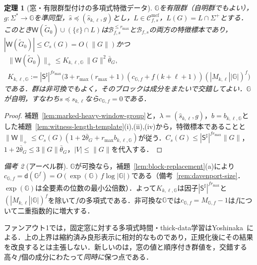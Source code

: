 \documentclass[11pt,a4paper]{ltjsarticle}
\numberwithin{equation}{section}
\theoremstyle{plain}
\newtheorem{theorem}{定理}[section]
\theoremstyle{definition}
\theoremstyle{remark}
\newtheorem{remark}[theorem]{備考}
\newcommand{\Wit}{\mathsf{W}}
\newcommand{\Cmcf}[2]{\mathcal{C}^{\mathrm{mcf}}_{#1,#2}}
\newcommand{\eps}{\varepsilon}
\begin{document}
\begin{theorem}[窓・有限群型付けの多項式特徴データ]
\label{thm:window-group-polydata}
${\mathbb G}$を有限群（自明群でもよい），$g:\Sigma^*\to {\mathbb G}$を準同型，$\widehat s\preceq(\widehat s_{k,\ell},g)$とし，$L\in\Cmcf{f}{s}$，$L(G)=L\cap\Sigma^+$とする．このとき$\Wit(\widetilde G_0)\cup(\{\eps\}\cap L)$は$\mathcal B^{\le r_{\max}}_{f,s}$と$\mathcal B_{f,s}$の両方の特徴標本であり，$|\Wit(\widetilde G_0)|\le C_s(G)=O(\|G\|)$かつ
\[
 \begin{gathered}
 \|\Wit(\widetilde G_0)\|_+\le K_{k,\ell,{\mathbb G}}\,\|G\|^2\bar\theta_G,\\
 K_{k,\ell,{\mathbb G}}:=|\mathsf S^\sharp|^{fr_{\max}}
 \bigl(3+r_{\max}(r_{\max}+1)(c_{{\mathbb G},f}+f(k+\ell+1))(|M_{k,\ell}||{\mathbb G}|)^f\bigr)
 \end{gathered}
\]
である．群は非可換でもよく，そのブロックは成分をまたいで交錯してよい．${\mathbb G}$が自明，すなわち$s\preceq s_{k,\ell}$なら$c_{{\mathbb G},f}=0$である．
\end{theorem}

\begin{proof}
補題~\ref{lem:marked-heavy-window-group}と，$\lambda=(\widehat s_{k,\ell},g)$，$b=b_{k,\ell,{\mathbb G}}$とした補題~\ref{lem:witness-length-template}(i),(ii),(iv)から，特徴標本であることと$\|\Wit\|_+\le C_s(G)(1+2\bar\theta_G+r_{\max}b_{k,\ell,{\mathbb G}})$が従う．$C_s(G)\le|\mathsf S^\sharp|^{fr_{\max}}\|G\|$，$1+2\bar\theta_G\le3\|G\|\bar\theta_G$，$|V|\le\|G\|$を代入する．
\end{proof}

\begin{remark}[アーベル群]
\label{rem:window-abelian}
${\mathbb G}$が可換なら，補題~\ref{lem:block-replacement}(a)により$c_{{\mathbb G},f}=\mathsf d({\mathbb G}^f)=O(\exp({\mathbb G})\,f\log|{\mathbb G}|)$である（備考~\ref{rem:davenport-size}．$\exp({\mathbb G})$は全要素の位数の最小公倍数）．よって$K_{k,\ell,{\mathbb G}}$は因子$|\mathsf S^\sharp|^{fr_{\max}}$と$(|M_{k,\ell}||{\mathbb G}|)^f$を除いて$f$の多項式である．非可換な${\mathbb G}$では$c_{{\mathbb G},f}=M_{{\mathbb G},f}-1$は$f$について二重指数的に増大する．
\end{remark}

ファンアウト1では，固定窓に対する多項式時間・thick-data学習はYoshinaka~\cite[Theorem~1]{Yoshinaka2008}による．上の上界は縮約済み良形表示に相対的なものであり，正規化後にその結果を改良するとは主張しない．新しいのは，窓の値と順序付き群値を，交錯する高々$f$個の成分にわたって\emph{同時に}保つ点である．
\end{document}

